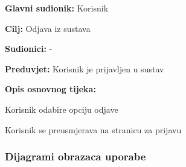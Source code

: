 					\noindent {}
					\begin{packed_item}
						
						\item \textbf{Glavni sudionik: }Korisnik
						\item  \textbf{Cilj:} Odjava iz sustava 
						\item  \textbf{Sudionici:} -
						\item  \textbf{Preduvjet:} Korisnik je prijavljen u sustav
						\item  \textbf{Opis osnovnog tijeka:}
						
						\item[] \begin{packed_enum}
							
							\item Korisnik odabire opciju odjave
							\item Korisnik se preusmjerava na stranicu za prijavu
						\end{packed_enum}
						
					\end{packed_item}
					
					\newpage
			
					
					
				\subsubsection{Dijagrami obrazaca uporabe}
					
